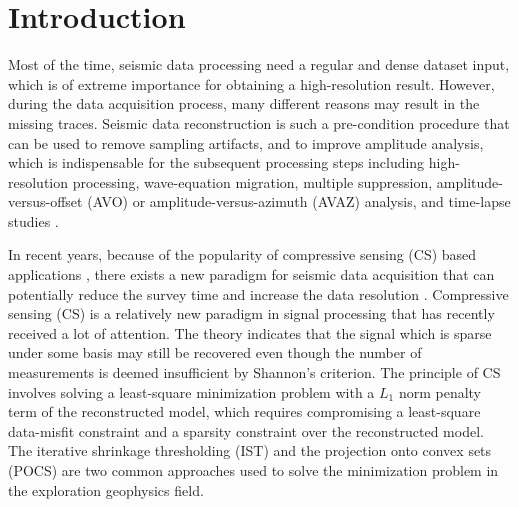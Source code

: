 \newpage

\section{Introduction}

Most of the time, seismic data processing need a regular and dense dataset input, which is of extreme importance for obtaining a high-resolution result.  However, during the data acquisition process, many different reasons may result in the missing traces. Seismic data reconstruction is such a pre-condition procedure that can be used to remove sampling artifacts, and to improve amplitude analysis, which is indispensable for the subsequent processing steps including high-resolution processing, wave-equation migration, multiple suppression, amplitude-versus-offset (AVO) or amplitude-versus-azimuth (AVAZ) analysis, and time-lapse studies \cite[]{daniel2002,liubin2004,abma2005,abma2006,juefu2010,mostafa2010,yangkang2014halfthr,yangkang2015eage2}. 

In recent years, because of the popularity of compressive sensing (CS) based applications \cite[]{candes20062}, there exists a new paradigm for seismic data acquisition that can potentially reduce the survey time and increase the data resolution \cite[]{herrmann2010}. Compressive sensing (CS) is a relatively new paradigm in signal processing that has recently received a lot of attention. The theory indicates that the signal which is sparse under some basis may still be recovered even though the number of measurements is deemed insufficient by Shannon's criterion. The principle of CS involves solving a least-square minimization problem with a $L_1$ norm penalty term of the reconstructed model, which requires compromising a least-square data-misfit constraint and a sparsity constraint over the reconstructed model. The iterative shrinkage thresholding (IST) and the projection onto convex sets (POCS) are two common approaches used to solve the minimization problem in the exploration geophysics field. 

